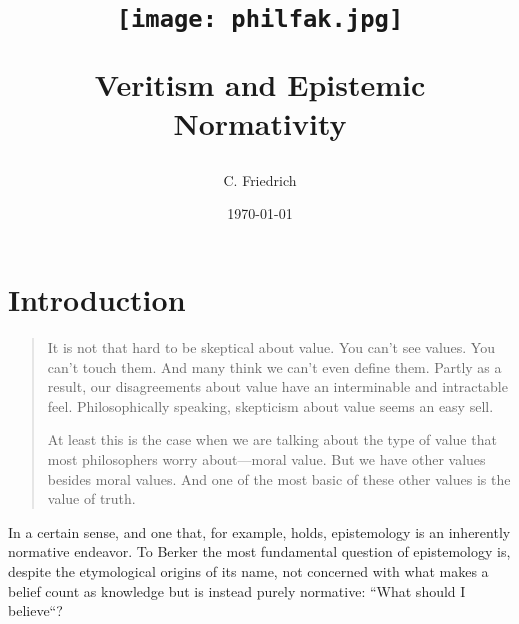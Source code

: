 \documentclass[12pt,numbers=noenddot]{scrartcl}
\title {    \begin{center}
        \texttt{[image: philfak.jpg]}
    \end{center}
     Veritism and Epistemic Normativity }
\author{C. Friedrich}
\date{\today}
\begin{document}
\begin{titlepage}
\maketitle


\thispagestyle{empty}
\end{titlepage}

\tableofcontents
\newpage

\section{Introduction}

\begin{quote}
    It is not that hard to be skeptical about value. You can't see values. You can't touch them. And many think we can't even define them. Partly as a result, our disagreements about value have an interminable and intractable feel. Philosophically speaking, skepticism about value seems an easy sell.

    At least this is the case when we are talking about the type of value that most philosophers worry about—moral value. But we have other values besides moral values. And one of the most basic of these other values is the value of truth. \autocite[225]{Lynch2009}
\end{quote}


In a certain sense, and one that, for example, \textcite{Berker2013-BERETA-2} holds, epistemology is an inherently normative endeavor. To Berker the most fundamental question of epistemology is, despite the etymological origins of its name, not concerned with what makes a belief count as knowledge but is instead purely normative: “What should I believe“?
\end{document}
